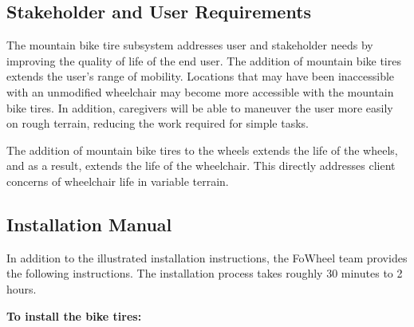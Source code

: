 \documentclass[12pt]{report}
\begin{document}
\subsection{Stakeholder and User Requirements}
The mountain bike tire subsystem addresses user and stakeholder needs by
improving the quality of life of the end user. The addition of mountain
bike tires extends the user's range of mobility. Locations that may have been
inaccessible with an unmodified wheelchair may become more accessible with the
mountain bike tires. In addition, caregivers will be able to maneuver the user more easily on rough
terrain, reducing the work required for simple tasks.

The addition of mountain bike tires to the wheels extends the life of the
wheels, and as a result, extends the life of the wheelchair. This directly
addresses client concerns of wheelchair life in variable terrain.

%

\subsection{Installation Manual}
In addition to the illustrated installation instructions, the FoWheel team
provides the following instructions. The installation process takes roughly 30
minutes to 2 hours.

\textbf{To install the bike tires:}
\end{document}
